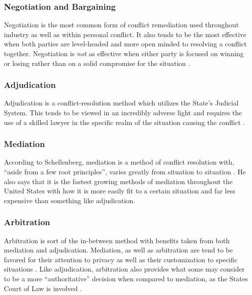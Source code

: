 \documentclass[stu,12pt]{apa7}
\begin{document}
        \subsubsection{Negotiation and Bargaining}
          Negotiation is the most common form of conflict remediation used
            throughout industry as well as within personal conflict. It also
            tends to be the most effective when both parties are level-headed
            and more open minded to resolving a conflict together. Negotiation
            is \textit{not} as effective when either party is focused on winning
            or losing rather than on a solid compromise for the situation
            \parencite[pp. 154]{schellenberg_conflict_1996}.

        \subsubsection{Adjudication}
          Adjudication is a conflict-resolution method which utilizes the
            State's Judicial System. This tends to be viewed in an incredibly
            adverse light and requires the use of a skilled lawyer in the
            specific realm of the situation causing the conflict
            \parencite[pp. 172]{schellenberg_conflict_1996}.

        \subsubsection{Mediation}
          According to Schellenberg, mediation is a method of conflict
            resolution with, ``aside from a few root principles'', varies
            greatly from situation to situation
            \parencite[pp. 192]{schellenberg_conflict_1996}. He also says that
            it is the fastest growing methods of mediation throughout the
            United States with how it is more easily fit to a certain situation
            and far less expensive than something like adjudication.

        \subsubsection{Arbitration}
          Arbitration is sort of the in-between method with benefits taken from
            both mediation and adjudication. Mediation, as well as arbitration
            are tend to be favored for their attention to privacy as well as
            their customization to specific situations
            \parencite[pp. 205]{schellenberg_conflict_1996}. Like adjudication,
            arbitration also provides what some may consider to be a more
            ``authoritative'' decision when compared to mediation, as the
            States Court of Law is involved
            \parencite[pp. 205]{schellenberg_conflict_1996}.
\end{document}
